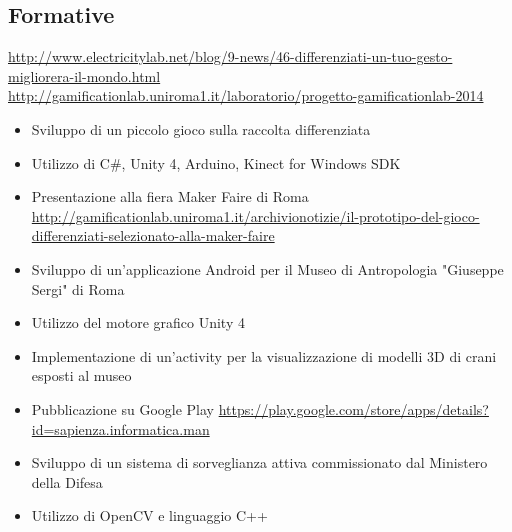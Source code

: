 \documentclass[11pt,a4paper,sans]{moderncv} %
\begin{document}
\clearpage
\subsection{Formative}

{
	\url{http://www.electricitylab.net/blog/9-news/46-differenziati-un-tuo-gesto-migliorera-il-mondo.html}
	\newline{}
	\url{http://gamificationlab.uniroma1.it/laboratorio/progetto-gamificationlab-2014}
	\begin{itemize}
		\item Sviluppo di un piccolo gioco sulla raccolta differenziata
		\item Utilizzo di C\#, Unity 4, Arduino, Kinect for Windows SDK
		\item Presentazione alla fiera Maker Faire di Roma
		\newline{} \url{http://gamificationlab.uniroma1.it/archivionotizie/il-prototipo-del-gioco-differenziati-selezionato-alla-maker-faire}
	\end{itemize}
}

{
	\begin{itemize}
		\item Sviluppo di un'applicazione Android per il Museo di Antropologia "Giuseppe Sergi" di Roma
		\item Utilizzo del motore grafico Unity 4
		\item Implementazione di un'activity per la visualizzazione di modelli 3D di crani esposti al museo
		\item Pubblicazione su Google Play
		\newline{}
		\url{https://play.google.com/store/apps/details?id=sapienza.informatica.man}
	\end{itemize}
}

{
	\begin{itemize}
		\item Sviluppo di un sistema di sorveglianza attiva commissionato dal Ministero della Difesa
		\item Utilizzo di OpenCV e linguaggio C++
	\end{itemize}
}

\end{document}
